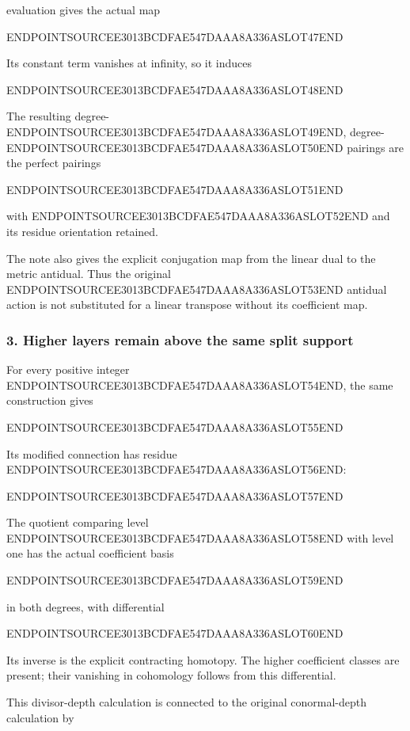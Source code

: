 evaluation gives the actual map

ENDPOINTSOURCEE3013BCDFAE547DAAA8A336ASLOT47END

Its constant term vanishes at infinity, so it induces

ENDPOINTSOURCEE3013BCDFAE547DAAA8A336ASLOT48END

The resulting degree-ENDPOINTSOURCEE3013BCDFAE547DAAA8A336ASLOT49END, degree-ENDPOINTSOURCEE3013BCDFAE547DAAA8A336ASLOT50END pairings are the perfect pairings

ENDPOINTSOURCEE3013BCDFAE547DAAA8A336ASLOT51END

with ENDPOINTSOURCEE3013BCDFAE547DAAA8A336ASLOT52END and its residue orientation retained.

The note also gives the explicit conjugation map from the linear dual to the metric antidual. Thus the original ENDPOINTSOURCEE3013BCDFAE547DAAA8A336ASLOT53END antidual action is not substituted for a linear transpose without its coefficient map.

\subsubsection{3. Higher layers remain above the same split support}\label{endpoint-exponential_constituent_original--higher-layers-remain-above-the-same-split-support}

For every positive integer ENDPOINTSOURCEE3013BCDFAE547DAAA8A336ASLOT54END, the same construction gives

ENDPOINTSOURCEE3013BCDFAE547DAAA8A336ASLOT55END

Its modified connection has residue ENDPOINTSOURCEE3013BCDFAE547DAAA8A336ASLOT56END:

ENDPOINTSOURCEE3013BCDFAE547DAAA8A336ASLOT57END

The quotient comparing level ENDPOINTSOURCEE3013BCDFAE547DAAA8A336ASLOT58END with level one has the actual coefficient basis

ENDPOINTSOURCEE3013BCDFAE547DAAA8A336ASLOT59END

in both degrees, with differential

ENDPOINTSOURCEE3013BCDFAE547DAAA8A336ASLOT60END

Its inverse is the explicit contracting homotopy. The higher coefficient classes are present; their vanishing in cohomology follows from this differential.

This divisor-depth calculation is connected to the original conormal-depth calculation by

